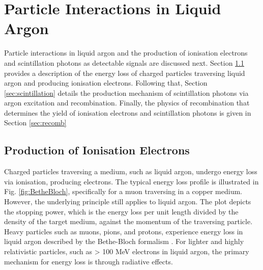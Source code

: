 
\section{Particle Interactions in Liquid Argon}
\label{sec3:creation}

Particle interactions in liquid argon and the production of ionisation electrons and scintillation photons as detectable signals are discussed next.       
Section \ref{sec3:bethebloch} provides a description of the energy loss of charged particles traversing liquid argon and producing ionisation electrons.                          
Following that, Section \ref{sec:scintillation} details the production mechanism of scintillation photons via argon excitation and recombination.                                       
Finally, the physics of recombination that determines the yield of ionisation electrons and scintillation photons is given in Section \ref{sec:recomb}
\subsection{Production of Ionisation Electrons}
\label{sec3:bethebloch}

Charged particles traversing a medium, such as liquid argon, undergo energy loss via ionisation, producing electrons.                                                                       
The typical energy loss profile is illustrated in Fig. \ref{fig:BetheBloch}, specifically for a muon traversing in a copper medium.
However, the underlying principle still applies to liquid argon.
The plot depicts the stopping power, which is the energy loss per unit length divided by the density of the target medium, against the momentum of the traversing particle.
Heavy particles such as muons, pions, and protons, experience energy loss in liquid argon described by the Bethe-Bloch formalism \cite{Passage}.
For lighter and highly relativistic particles, such as > 100 MeV electrons in liquid argon, the primary mechanism for energy loss is through radiative effects.


